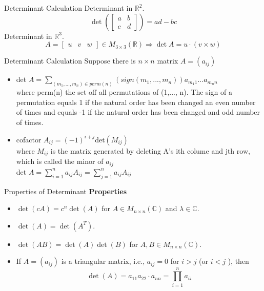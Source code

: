 \documentclass[aspectratio=169, UTF8]{ctexbeamer}
\begin{document}
\begin{frame}{Determinant Calculation}
Determinant in $\mathbb{R}^{2}$.
$$
\operatorname{det}\left(\left[\begin{array}{ll}
a & b \\
c & d
\end{array}\right]\right)=a d-b c
$$
Determinant in $\mathbb{R}^{3}$.
$$
A=\left[\begin{array}{lll}
u & v & w
\end{array}\right] \in M_{3 \times 3}(\mathbb{R}) \Rightarrow \operatorname{det} A=u \cdot(v \times w)
$$    
\end{frame}

\begin{frame}{Determinant Calculation}
    Suppose there is $n\times n$ matrix $A = (a_{ij})$
    \begin{itemize}
        \item det $A = \sum_{(m_1, ..., m_n)\in perm (n)} (sign(m_1, ..., m_n)) a_{m_1 1}...a_{m_n n}$ \\[10pt]
        where perm(n) the set off all permutations of (1,..., n). The sign of a permutation equals 1 if the natural order has been changed an even number of times and equals -1 if the natural order has been changed and odd number of times.
    \end{itemize}
    
    \begin{itemize}
        \item cofactor $A_{ij} = (-1)^{i+j}$det$(M_{ij})$ \\[10pt]
        where $M_{ij}$ is the matrix generated by deleting A's ith colume and jth row, which is called the minor of $a_{ij}$
        \\[10pt]
        det $A = \sum_{i = 1}^n a_{ij}A_{ij} = \sum_{j = 1}^n a_{ij}A_{ij}$
    \end{itemize}
\end{frame}

\begin{frame}{Properties of Determinant}
    \textbf{Properties}
\begin{itemize}
    \item $\operatorname{det}(c A)=c^{n} \operatorname{det}(A)$ for $A \in M_{n \times n}(\mathbb{C})$ and $\lambda \in \mathbb{C}$.
    \item $\operatorname{det}(A)=\operatorname{det}\left(A^{T}\right)$.
    \item $\operatorname{det}(A B)=\operatorname{det}(A) \operatorname{det}(B)$ for $A, B \in M_{n \times n}(\mathbb{C})$.
    \item If $A=\left(a_{ij} \right)$ is a triangular matrix, i.e., $a_{ij} =0$ for $i>j$ (or $i<j$ ), then 
    $$\operatorname{det}(A)=a_{11} a_{22} \cdot a_{n n}=\prod_{i=1}^{n} a_{i i}$$
\end{itemize}
\end{frame}
\end{document}

